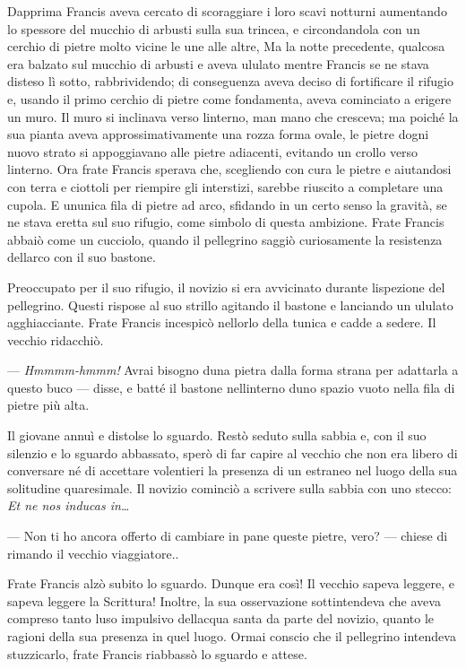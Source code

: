 Dapprima Francis aveva cercato di scoraggiare i loro scavi notturni
aumentando lo spessore del mucchio di arbusti sulla sua trincea, e
circondandola con un cerchio di pietre molto vicine le une alle altre,
Ma la notte precedente, qualcosa era balzato sul mucchio di arbusti e
aveva ululato mentre Francis se ne stava disteso lì sotto,
rabbrividendo; di conseguenza aveva deciso di fortificare il rifugio e,
usando il primo cerchio di pietre come fondamenta, aveva cominciato a
erigere un muro. Il muro si inclinava verso l\textquotesingle interno,
man mano che cresceva; ma poiché la sua pianta aveva approssimativamente
una rozza forma ovale, le pietre d\textquotesingle ogni nuovo strato si
appoggiavano alle pietre adiacenti, evitando un crollo verso
l\textquotesingle interno. Ora frate Francis sperava che, scegliendo con
cura le pietre e aiutandosi con terra e ciottoli per riempire gli
interstizi, sarebbe riuscito a completare una cupola. E
un\textquotesingle unica fila di pietre ad arco, sfidando in un certo
senso la gravità, se ne stava eretta sul suo rifugio, come simbolo di
questa ambizione. Frate Francis abbaiò come un cucciolo, quando il
pellegrino saggiò curiosamente la resistenza dell\textquotesingle arco
con il suo bastone.

Preoccupato per il suo rifugio, il novizio si era avvicinato durante
l\textquotesingle ispezione del pellegrino. Questi rispose al suo
strillo agitando il bastone e lanciando un ululato agghiacciante. Frate
Francis incespicò nell\textquotesingle orlo della tunica e cadde a
sedere. Il vecchio ridacchiò.

--- \emph{Hmmmm-hmmm!} Avrai bisogno d\textquotesingle una pietra dalla
forma strana per adattarla a questo buco --- disse, e batté il bastone
nell\textquotesingle interno d\textquotesingle uno spazio vuoto nella
fila di pietre più alta.

Il giovane annuì e distolse lo sguardo. Restò seduto sulla sabbia e, con
il suo silenzio e lo sguardo abbassato, sperò di far capire al vecchio
che non era libero di conversare né di accettare volentieri la presenza
di un estraneo nel luogo della sua solitudine quaresimale. Il novizio
cominciò a scrivere sulla sabbia con uno stecco: \emph{Et ne nos inducas
	in\ldots{}}

--- Non ti ho ancora offerto di cambiare in pane queste pietre, vero?
--- chiese di rimando il vecchio viaggiatore..

Frate Francis alzò subito lo sguardo. Dunque era così! Il vecchio sapeva
leggere, e sapeva leggere la Scrittura! Inoltre, la sua osservazione
sottintendeva che aveva compreso tanto l\textquotesingle uso impulsivo
dell\textquotesingle acqua santa da parte del novizio, quanto le ragioni
della sua presenza in quel luogo. Ormai conscio che il pellegrino
intendeva stuzzicarlo, frate Francis riabbassò lo sguardo e attese.

